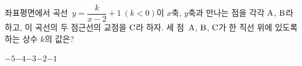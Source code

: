 좌표평면에서 곡선~$y=\dfrac{k}{x-2}+1\ (k<0)$이 $x$축, $y$축과 만나는 점을 각각 $\mathrm{A}$, $\mathrm{B}$라 하고, 이 곡선의 두 점근선의 교점을 $\mathrm{C}$라 하자. 세 점~$\mathrm{A}$, $\mathrm{B}$, $\mathrm{C}$가 한 직선 위에 있도록 하는 상수 $k$의 값은?
\begin{choices32}{$-5$}{$-4$}{$-3$}{$-2$}{$-1$}\end{choices32}
